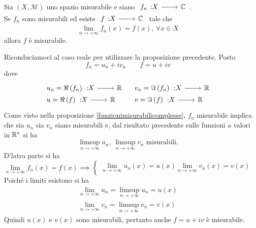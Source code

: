\begin{corollary}
	Sia $\left(X,\mathcal{M}\right)$ uno spazio misurabile e siano $\funz{f_n}{X}{\complexset}$.\\
	Se $f_n$ sono misurabili ed esiste $\funz{f}{X}{\complexset}$ tale che
	\begin{equation*}
		\lim_{n\to+\infty}f_n\left(x\right)=f\left(x\right),\ \forall x\in X
	\end{equation*}
	allora $f$ è misurabile.
\end{corollary}
\begin{demonstration}
	Riconduciamoci al caso reale per utilizzare la proposizione precedente. Posto
	\begin{equation*}
		f_n=u_n+iv_n\qquad f=u+iv
	\end{equation*}
dove
\begin{equation*}
	\begin{array}{ll}
		\funz{u_n=\Re\left(f_n\right)}{X}{\realset}&\funz{v_n=\Im\left(f_n\right)}{X}{\realset}\\
		\funz{u=\Re\left(f\right)}{X}{\realset}&\funz{v=\Im\left(f\right)}{X}{\realset}
	\end{array}
\end{equation*}
Come visto nella proposizione \ref{funzionimisurabilicomplesse}, $f_n$ misurabile implica che sia $u_n$ sia $v_n$ siano misurabili e, dal risultato precedente sulle funzioni a valori in $\mathbb{R}^{\ast}$ si ha
\begin{equation*}
	\limsup_{n\to+\infty}u_n,\ \limsup_{n\to+\infty}v_n\text{ misurabili.}
\end{equation*}
D'latra parte si ha
\begin{equation*}
	\lim_{n\to+\infty}f_n\left(x\right)=f\left(x\right)\implies
	\begin{cases}
		\lim_{n\to+\infty}u_n\left(x\right)=u\left(x\right)
		\lim_{n\to+\infty}v_n\left(x\right)=v\left(x\right)
	\end{cases}
\end{equation*}
Poiché i limiti esistono si ha
\begin{gather*}
	\lim_{n\to+\infty}u_n=\limsup_{n\to+\infty}u_n=u\left(x\right)\\	\lim_{n\to+\infty}v_n=\limsup_{n\to+\infty}v_n=v\left(x\right)
\end{gather*}
Quindi $u\left(x\right)$ e $v\left(x\right)$ sono misurabili, pertanto anche $f=u+iv$ è misurabile.
\end{demonstration}
